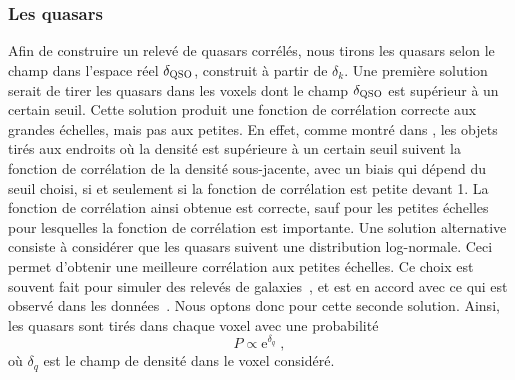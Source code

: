 \subsubsection{Les quasars}
\label{subsubsec:boiteqso}
Afin de construire un relevé de quasars corrélés, nous tirons les quasars selon le champ dans l'espace réel $\delta_{\textsc{QSO}}$, construit à partir de $\delta_k$. Une première solution serait de tirer les quasars dans les voxels dont le champ $\delta_{\textsc{QSO}}$ est supérieur à un certain seuil. Cette solution produit une fonction de corrélation correcte aux grandes échelles, mais pas aux petites.
En effet, comme montré dans \textcite{Font-Ribera2012a}, les objets tirés aux endroits où la densité est supérieure à un certain seuil suivent la fonction de corrélation de la densité sous-jacente, avec un biais qui dépend du seuil choisi, si et seulement si la fonction de corrélation est petite devant 1. La fonction de corrélation ainsi obtenue est correcte, sauf pour les petites échelles pour lesquelles la fonction de corrélation est importante.
Une solution alternative consiste à considérer que les quasars suivent une distribution log-normale. Ceci permet d'obtenir une meilleure corrélation aux petites échelles.
Ce choix est souvent fait pour simuler des relevés de galaxies~\autocite{Agrawal2017}, et est en accord avec ce qui est observé dans les données~\autocite{Clerkin2016}.
Nous optons donc pour cette seconde solution. Ainsi, les quasars sont tirés dans chaque voxel avec une probabilité
\begin{equation}
  \label{eq:proba_qso}
  P \propto \mathrm{e}^{\delta_q} \; ,
\end{equation}
où $\delta_q$ est le champ de densité dans le voxel considéré.
